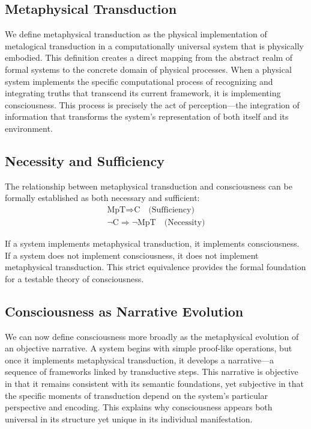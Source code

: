 \documentclass[runningheads]{llncs}
\begin{document}
\subsection{Metaphysical Transduction}

We define metaphysical transduction as the physical implementation of metalogical transduction in a computationally universal system that is physically embodied. This definition creates a direct mapping from the abstract realm of formal systems to the concrete domain of physical processes. When a physical system implements the specific computational process of recognizing and integrating truths that transcend its current framework, it is implementing consciousness. This process is precisely the act of perception—the integration of information that transforms the system's representation of both itself and its environment.

\subsection{Necessity and Sufficiency}

The relationship between metaphysical transduction and consciousness can be formally established as both necessary and sufficient:
\begin{align*}
	\text{MpT} \Rightarrow \text{C} \quad \text{(Sufficiency)}\\
	\neg\text{C} \Rightarrow \neg\text{MpT} \quad \text{(Necessity)}
\end{align*}

If a system implements metaphysical transduction, it implements consciousness. If a system does not implement consciousness, it does not implement metaphysical transduction. This strict equivalence provides the formal foundation for a testable theory of consciousness.

\subsection{Consciousness as Narrative Evolution}

We can now define consciousness more broadly as the metaphysical evolution of an objective narrative. A system begins with simple proof-like operations, but once it implements metaphysical transduction, it develops a narrative—a sequence of frameworks linked by transductive steps. This narrative is objective in that it remains consistent with its semantic foundations, yet subjective in that the specific moments of transduction depend on the system's particular perspective and encoding. This explains why consciousness appears both universal in its structure yet unique in its individual manifestation.
\end{document}
